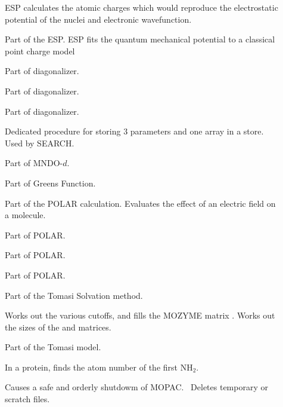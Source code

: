 \begin{description}
\item[] ESP calculates the atomic charges which would reproduce
the electrostatic potential of the nuclei and electronic wavefunction.

\item[] Part of the ESP.  ESP fits the quantum mechanical
potential to a classical point charge model

\item[] Part of diagonalizer.

\item[] Part of diagonalizer.

\item[] Part of diagonalizer.

\item[] Dedicated procedure for storing 3 parameters and one array
in a store. Used by SEARCH.

\item[] Part of MNDO-$d$.

\item[] Part of Greens Function.

\item[] Part of the POLAR calculation.  Evaluates the  effect of
an electric field on a molecule.

\item[] Part of POLAR.

\item[] Part of POLAR.

\item[] Part of POLAR.

\item[] Part of the Tomasi Solvation method.

\item[] Works out the various cutoffs, and fills the 
MOZYME matrix .  Works out the sizes of the  and 
matrices.

\item[] Part of the Tomasi model.

\item[] In a protein,  finds the atom number of the
first NH$_2$.    

\item[] Causes a safe and orderly shutdowm of MOPAC. \ Deletes 
temporary or scratch files.


\end{description}
